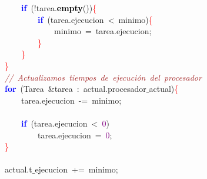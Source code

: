 \mbox{}\ \ \ \ \ \ \ \ \ \ \ \ \ \ \ \ \ \ \ \ \textbf{\textcolor{Blue}{if}}\ \textcolor{BrickRed}{(!}tarea\textcolor{BrickRed}{.}\textbf{\textcolor{Black}{empty}}\textcolor{BrickRed}{())}\textcolor{Red}{\{} \\
\mbox{}\ \ \ \ \ \ \ \ \ \ \ \ \ \ \ \ \ \ \ \ \ \ \ \ \textbf{\textcolor{Blue}{if}}\ \textcolor{BrickRed}{(}tarea\textcolor{BrickRed}{.}ejecucion\ \textcolor{BrickRed}{\textless{}}\ minimo\textcolor{BrickRed}{)}\textcolor{Red}{\{} \\
\mbox{}\ \ \ \ \ \ \ \ \ \ \ \ \ \ \ \ \ \ \ \ \ \ \ \ \ \ \ \ minimo\ \textcolor{BrickRed}{=}\ tarea\textcolor{BrickRed}{.}ejecucion\textcolor{BrickRed}{;} \\
\mbox{}\ \ \ \ \ \ \ \ \ \ \ \ \ \ \ \ \ \ \ \ \ \ \ \ \textcolor{Red}{\}} \\
\mbox{}\ \ \ \ \ \ \ \ \ \ \ \ \ \ \ \ \ \ \ \ \textcolor{Red}{\}} \\
\mbox{}\ \ \ \ \ \ \ \ \ \ \ \ \ \ \ \ \textcolor{Red}{\}} \\
\mbox{}\ \ \ \ \ \ \ \ \ \ \ \ \ \ \ \ \textit{\textcolor{Brown}{//\ Actualizamos\ tiempos\ de\ ejecución\ del\ procesador}} \\
\mbox{}\ \ \ \ \ \ \ \ \ \ \ \ \ \ \ \ \textbf{\textcolor{Blue}{for}}\ \textcolor{BrickRed}{(}\textcolor{TealBlue}{Tarea}\ \textcolor{BrickRed}{\&}tarea\ \textcolor{BrickRed}{:}\ actual\textcolor{BrickRed}{.}procesador$\_$actual\textcolor{BrickRed}{)}\textcolor{Red}{\{} \\
\mbox{}\ \ \ \ \ \ \ \ \ \ \ \ \ \ \ \ \ \ \ \ tarea\textcolor{BrickRed}{.}ejecucion\ \textcolor{BrickRed}{-=}\ minimo\textcolor{BrickRed}{;} \\
\mbox{} \\
\mbox{}\ \ \ \ \ \ \ \ \ \ \ \ \ \ \ \ \ \ \ \ \textbf{\textcolor{Blue}{if}}\ \textcolor{BrickRed}{(}tarea\textcolor{BrickRed}{.}ejecucion\ \textcolor{BrickRed}{\textless{}}\ \textcolor{Purple}{0}\textcolor{BrickRed}{)} \\
\mbox{}\ \ \ \ \ \ \ \ \ \ \ \ \ \ \ \ \ \ \ \ \ \ \ \ tarea\textcolor{BrickRed}{.}ejecucion\ \textcolor{BrickRed}{=}\ \textcolor{Purple}{0}\textcolor{BrickRed}{;} \\
\mbox{}\ \ \ \ \ \ \ \ \ \ \ \ \ \ \ \ \textcolor{Red}{\}} \\
\mbox{} \\
\mbox{}\ \ \ \ \ \ \ \ \ \ \ \ \ \ \ \ actual\textcolor{BrickRed}{.}t$\_$ejecucion\ \textcolor{BrickRed}{+=}\ minimo\textcolor{BrickRed}{;} \\
\mbox{}\ \ \ \ \ \ \ \ \ \ \ \ \ \ \ \  \\

